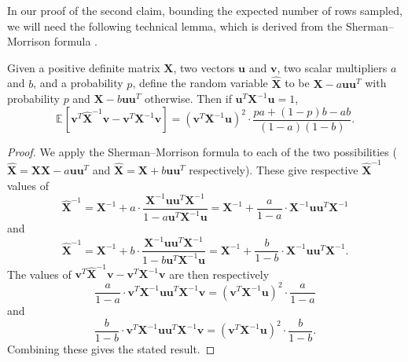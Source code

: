 \documentclass{toc}
\newcommand{\bv}[1]{\mathbf{#1}}
\newcommand{\expct}[3]{\mathbb{E}_{{#1}_{#2}}\left[#3\right]}
\begin{document}
In our proof of the second claim, bounding the expected number of rows sampled, we will need the following technical lemma, which is derived from the
Sherman--Morrison formula \cite{sherman1949adjustment}.
%
\begin{lemma}
\label{lem:rankoneupdate}
Given a positive definite matrix $\bv{X}$, two vectors $\bv{u}$ and $\bv{v}$, two scalar multipliers $a$ and $b$, and a probability $p$, define the random variable $\bv{\widehat X}$ to be $\bv X - a \bv{u} \bv{u}^T$ with probability $p$ and $\bv X - b \bv{u} \bv{u}^T$ otherwise.  Then if $\bv{u}^T \bv{X}^{-1} \bv{u} = 1$,
$$
\expct{}{}{\bv{v}^T \bv{\widehat X}^{-1} \bv{v} - \bv{v}^T \bv{X}^{-1} \bv{v}} = (\bv{v}^T \bv{X}^{-1} \bv{u})^2 \cdot \frac{pa + (1-p)b - ab}{(1-a)(1-b)}.
$$
\end{lemma}
\begin{proof}
We apply the Sherman--Morrison formula to each of the two possibilities ($\bv{\widehat X} = \bv{XX} - a \bv{u} \bv{u}^T$ and $\bv{\widehat X} = \bv{X} + b \bv{u} \bv{u}^T$ respectively).  These give respective ${\bv{\widehat X}}^{-1}$ values of %
$$
{\bv{\widehat X}}^{-1} = \bv{X}^{-1} + a \cdot \frac{\bv{X}^{-1} \bv{u} \bv{u}^T \bv{X}^{-1}}{1 - a \bv{u}^T \bv{X}^{-1} \bv{u}} = \bv{X}^{-1} + \frac{a}{1-a} \cdot  \bv{X}^{-1} \bv{u} \bv{u}^T \bv{X}^{-1}
$$
and
$$
{\bv{\widehat X}}^{-1} = \bv{X}^{-1} + b\cdot \frac{\bv{X}^{-1} \bv{u} \bv{u}^T \bv{X}^{-1}}{1 - b \bv{u}^T \bv{X}^{-1} \bv{u}} = \bv{X}^{-1} + \frac{b}{1-b} \cdot \bv{X}^{-1} \bv{u} \bv{u}^T \bv{X}^{-1}.
$$
The values of $\bv{v}^T \bv{\widehat  X}^{-1} \bv{v} - \bv{v}^T \bv{X}^{-1} \bv{v}$ are then respectively
$$
\frac{a}{1-a} \cdot \bv{v}^T \bv{X}^{-1} \bv{u} \bv{u}^T \bv{X}^{-1} \bv{v} = (\bv{v}^T \bv{X}^{-1} \bv{u})^2 \cdot \frac{a}{1-a}
$$
and
$$
\frac{b}{1-b} \cdot \bv{v}^T \bv{X}^{-1} \bv{u} \bv{u}^T \bv{X}^{-1} \bv{v} = (\bv{v}^T \bv{X}^{-1} \bv{u})^2\cdot  \frac{b}{1-b}.
$$
Combining these gives the stated result.
\end{proof}
\end{document}
